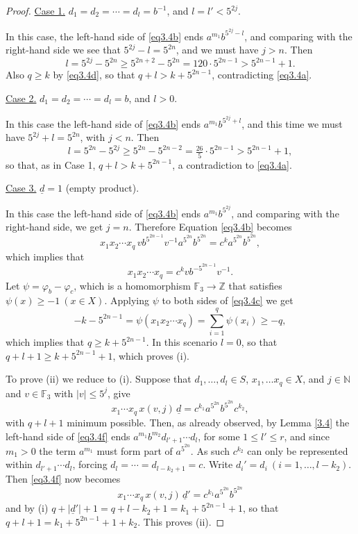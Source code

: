\documentclass[twoside,11pt]{amsart}
\numberwithin{equation}{section}
\theoremstyle{definition}
\newcommand {\N}{\mathbb N}
\newcommand {\Z}{\mathbb Z}
\newcommand{\1}{\mathbbm{1}}
\newcommand{\F}{\mathbb F}
\newcommand{\pdt}{\underline}
\begin{document}
\begin{proof}
		\vskip 2mm
		\noindent
		\underline{Case 1.} $d_1 = d_2 = \cdots = d_{l} = b^{-1}$, and $l=l'< 5^{2j}$.
		
		In this case, the left-hand side of \eqref{eq3.4b} ends $a^{m_1} b^{5^{2j}-l}$, and comparing with the right-hand side we see that $5^{2j}-l = 5^{2n}$, and we must have $j>n$. Then 
		$$l = 5^{2j}-5^{2n} \geq 5^{2n+2} - 5^{2n} = 120\cdot 5^{2n-1} > 5^{2n-1}+1.$$
		Also $q \geq k$ by \eqref{eq3.4d}, so that $q+l>k + 5^{2n-1}$, contradicting \eqref{eq3.4a}.
		
		\vskip 2mm
		\noindent
		\underline{Case 2.} $d_1 = d_2 = \cdots = d_l = b$, and $l >0$.
		
		In this case  the left-hand side of \eqref{eq3.4b} ends
		$a^{m_1} b^{5^{2j}+l}$, and this time we must have $5^{2j}+l = 5^{2n}$, with $j<n$. Then 
		$$l = 5^{2n} - 5^{2j} \geq 5^{2n} - 5^{2n-2} = \tfrac{26}{5} \cdot 5^{2n-1} >  5^{2n-1} + 1,$$
		so that, as in Case 1, $q+l > k + 5^{2n-1}$, a contradiction to \eqref{eq3.4a}.
		
		\vskip 2mm
		\noindent
		\underline{Case 3.} $\pdt{d} = 1$ (empty product).
		
		In this case  the left-hand side of \eqref{eq3.4b} ends $a^{m_1} b^{5^{2j}}$, and comparing with the right-hand side, we get $j=n$. Therefore Equation \eqref{eq3.4b} becomes
		$$x_1 x_2 \cdots x_q \, vb^{5^{2n-1}}v^{-1} a^{5^{2n}}b^{5^{2n}} = c^k a^{5^{2n}} b^{5^{2n}},$$
		which implies that 
		\begin{equation}	\label{eq3.4c}
			x_1 x_2 \cdots x_q = 
			c^k vb^{-5^{2n-1}} v^{-1}.
		\end{equation}		
		Let $\psi = \varphi_b - \varphi_c$, which is a homomorphism $\F_3 \to \Z$ that satisfies $\psi(x) \geq -1 \ (x \in X)$. Applying $\psi$ to both sides of \eqref{eq3.4c} we get
		\begin{equation*}	
			-k- 5^{2n-1} = \psi(x_1 x_2 \cdots x_q) 
			=  \sum_{i=1}^q \psi(x_i) \geq -q,
		\end{equation*}
		which implies that $q \geq k+ 5^{2n-1}$. In this scenario $l=0$, so that $q+l+1 \geq k + 5^{2n-1} +1$, which proves (i).
		
		To prove (ii) we reduce to (i).  Suppose that
		$d_1, \ldots, d_l \in S$, $x_1, \ldots x_q \in X$, and $j \in \N$ and $ v \in \F_3$ with $|v| \leq 5^j$, give
		\begin{equation} 	\label{eq3.4f}
			x_1 \cdots x_q \, x(v,j) \, \pdt{d} = c^{k_1} a^{5^{2n}} b^{5^{2n}}c^{k_2},
		\end{equation}
		with $q+l+1$ minimum possible.
		Then, as already observed, by Lemma \ref{3.4} the left-hand side of \eqref{eq3.4f} ends $a^{m_1}b^{m_2} d_{l'+1} \cdots d_l$, for some $1\leq l' \leq r$, and since $m_1>0$ the term $a^{m_1}$ must form part of $a^{5^{2n}}$. As such $c^{k_2}$ can only be represented within $d_{l'+1} \cdots d_l$, forcing $d_l= \cdots = d_{l-k_2+1} = c$. Write $d_i' = d_i \ (i = 1, \ldots, l-k_2)$. Then \eqref{eq3.4f} now becomes 
		$$x_1 \cdots x_q \, x(v,j) \, \pdt{d}' = c^{k_1} a^{5^{2n}} b^{5^{2n}}$$
		and by (i) $q + |\pdt{d}'| + 1 = q + l-k_2 + 1  = k_1 + 5^{2n-1} + 1$, so that $q + l +1 = k_1 + 5^{2n-1} + 1 + k_2.$ This proves (ii).
	\end{proof}
	
\end{document}

